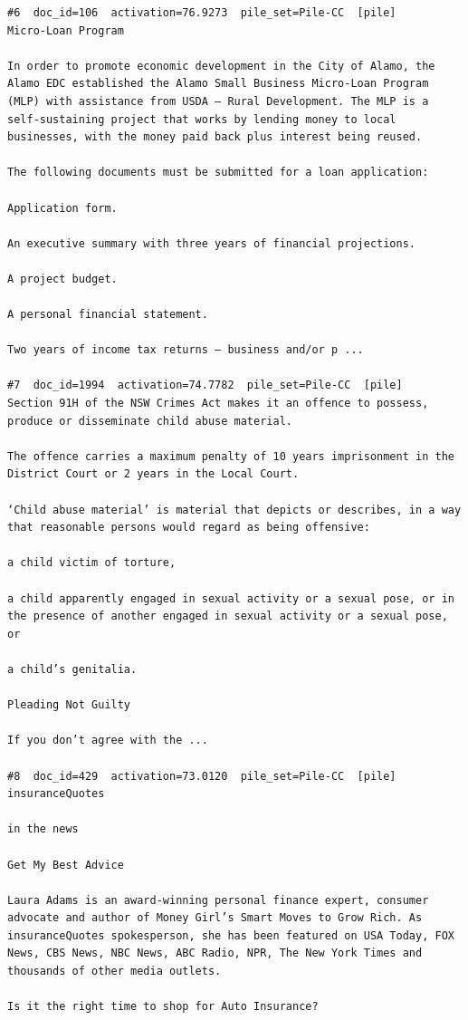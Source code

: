 \begin{verbatim}
#6  doc_id=106  activation=76.9273  pile_set=Pile-CC  [pile]
Micro-Loan Program

In order to promote economic development in the City of Alamo, the Alamo EDC established the Alamo Small Business Micro-Loan Program (MLP) with assistance from USDA – Rural Development. The MLP is a self-sustaining project that works by lending money to local businesses, with the money paid back plus interest being reused.

The following documents must be submitted for a loan application:

Application form.

An executive summary with three years of financial projections.

A project budget.

A personal financial statement.

Two years of income tax returns – business and/or p ...

#7  doc_id=1994  activation=74.7782  pile_set=Pile-CC  [pile]
Section 91H of the NSW Crimes Act makes it an offence to possess, produce or disseminate child abuse material.

The offence carries a maximum penalty of 10 years imprisonment in the District Court or 2 years in the Local Court.

‘Child abuse material’ is material that depicts or describes, in a way that reasonable persons would regard as being offensive:

a child victim of torture,

a child apparently engaged in sexual activity or a sexual pose, or in the presence of another engaged in sexual activity or a sexual pose, or

a child’s genitalia.

Pleading Not Guilty

If you don’t agree with the ...

#8  doc_id=429  activation=73.0120  pile_set=Pile-CC  [pile]
insuranceQuotes

in the news

Get My Best Advice

Laura Adams is an award-winning personal finance expert, consumer advocate and author of Money Girl’s Smart Moves to Grow Rich. As insuranceQuotes spokesperson, she has been featured on USA Today, FOX News, CBS News, NBC News, ABC Radio, NPR, The New York Times and thousands of other media outlets.

Is it the right time to shop for Auto Insurance?


\end{verbatim}
